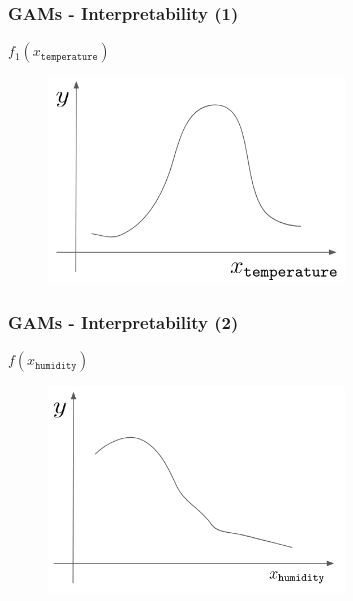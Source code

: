 \documentclass{beamer}
\begin{document}
\begin{frame}
  \frametitle{GAMs - Interpretability (1)}

  $f_1(x_{\mathtt{temperature}})$

  \noindent\makebox[\linewidth]{\rule{\paperwidth}{0.4pt}}

  \begin{figure}[ht]
    \centering
    \includegraphics[width=0.7\textwidth]{./figures/gam_temperature.jpg}
  \end{figure}

\end{frame}


\begin{frame}
  \frametitle{GAMs - Interpretability (2)}

  $f(x_{\mathtt{humidity}})$

  \noindent\makebox[\linewidth]{\rule{\paperwidth}{0.4pt}}

  \begin{figure}[ht]
    \centering
    \includegraphics[width=0.7\textwidth]{./figures/gam_humidity.jpg}
  \end{figure}

\end{frame}
\end{document}
